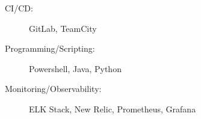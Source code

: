 \begin{minipage}[t]{.5\linewidth}
  \begin{description}
    \item[CI/CD:] GitLab, TeamCity
  \end{description}
\end{minipage}

\begin{minipage}[t]{.8\linewidth}
  \begin{description}
    \item[Programming/Scripting:] Powershell, Java, Python
  \end{description}
\end{minipage}

\begin{minipage}[t]{.8\linewidth}
  \begin{description}
    \item[Monitoring/Observability:] ELK Stack, New Relic, Prometheus, Grafana
  \end{description}
\end{minipage}
